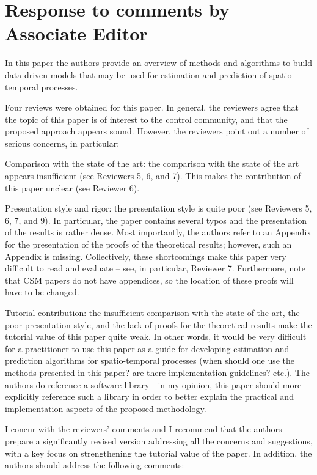 \documentclass{letter}
\begin{document}
\section{Response to comments by Associate Editor}

In this paper the authors provide an overview of methods and algorithms
to build data-driven models that may be used for estimation and
prediction of spatio-temporal processes. 

Four reviews were obtained for this paper. In general, the reviewers
agree that the topic of this paper is of interest to the control
community, and that the proposed approach appears sound. However, the
reviewers point out a number of serious concerns, in particular:

Comparison with the state of the art: the comparison with the state
of the art appears insufficient (see Reviewers 5, 6, and 7). This makes
the contribution of this paper unclear (see Reviewer 6).

Presentation style and rigor: the presentation style is quite poor
(see Reviewers 5, 6, 7, and 9). In particular, the paper contains
several typos and the presentation of the results is rather dense. Most
importantly, the authors refer to an Appendix for the presentation of
the proofs of the theoretical results; however, such an Appendix is
missing. Collectively, these shortcomings make this paper very
difficult to read and evaluate -- see, in particular, Reviewer 7.
Furthermore, note that CSM papers do not have appendices, 
so the location of these proofs will have to be changed.

Tutorial contribution: the insufficient comparison with the state of
the art, the poor presentation style, and the lack of proofs for the
theoretical results make the tutorial value of this paper quite weak.
In other words, it would be very difficult for a practitioner to use
this paper as a guide for developing estimation and prediction
algorithms for spatio-temporal processes (when should one use the
methods presented in this paper? are there implementation guidelines?
etc.). The authors do reference a software library - in my opinion,
this paper should more explicitly reference such a library in order to
better explain the practical and implementation aspects of the proposed
methodology.

 I concur with the reviewers’ comments and I recommend that the authors
prepare a significantly revised version addressing all the
concerns and suggestions, with a key focus on strengthening the
tutorial value of the paper. In addition, the authors should address
the following comments:
\end{document}
